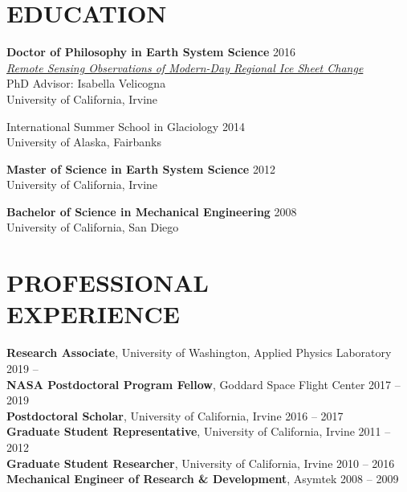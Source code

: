 \documentclass[margin,line,11pt]{res}
\begin{document}


\address{email: \href{mailto:tsutterl@uw.edu}{tsutterl@uw.edu}}
\address{website: \href{https://tsutterley.github.io}{tsutterley.github.io}}

\begin{resume}

\section{EDUCATION}
	{\bf Doctor of Philosophy in Earth System Science} \hfill 2016  \\
		{\em\href{http://search.proquest.com/docview/1794656381}{Remote Sensing Observations of Modern-Day Regional Ice Sheet Change}} \\
		PhD Advisor: Isabella Velicogna \\
		University of California, Irvine

	International Summer School in Glaciology \hfill 2014\\
	University of Alaska, Fairbanks

	{\bf Master of Science in Earth System Science} \hfill 2012  \\
		University of California, Irvine

	{\bf Bachelor of Science in Mechanical Engineering} \hfill 2008  \\
		University of California, San Diego

\section{PROFESSIONAL \\ EXPERIENCE}
	{\bf Research Associate}, University of Washington, Applied Physics Laboratory \hfill 2019 -- \\
	{\bf NASA Postdoctoral Program Fellow}, Goddard Space Flight Center \hfill 2017 -- 2019\\
	{\bf Postdoctoral Scholar}, University of California, Irvine \hfill 2016 -- 2017 \\
	{\bf Graduate Student Representative}, University of California, Irvine \hfill 2011 -- 2012 \\
	{\bf Graduate Student Researcher}, University of California, Irvine \hfill 2010 -- 2016 \\
	{\bf Mechanical Engineer of Research \& Development}, Asymtek \hfill 2008 -- 2009


\end{resume}
\end{document}
